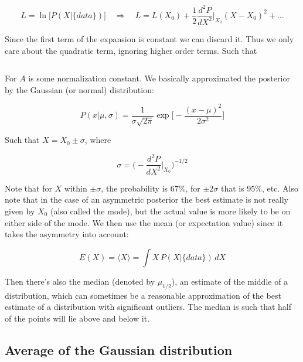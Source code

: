 \documentclass[a4paper]{article}
\begin{document}
\begin{equation}
	L=\ln\big[P(X|\{data\})\big]\quad\Rightarrow\quad L=L(X_0)+\frac{1}{2}\frac{d^2P}{dX^2}\bigg|_{X_0}(X-X_0)^2+\dots
\end{equation}

Since the first term of the expansion is constant we can discard it. Thus we only care about the quadratic term, ignoring higher order terms. Such that

\begin{equation}
	[P(X|\{data\})\approx A\exp\bigg[\frac{1}{2}\frac{d^2P}{dX^2}\bigg|_{X_0}(X-X_0)^2\bigg]
\end{equation}

For $A$ is some normalization constant. We basically approximated the posterior by the Gaussian (or normal) distribution:

\begin{equation}
	P(x|\mu, \sigma)=\frac{1}{\sigma\sqrt{2\pi}}\exp\bigg[-\frac{(x-\mu)^2}{2\sigma^2}\bigg]
\end{equation}

Such that $X=X_0\pm\sigma$, where

\begin{equation}
	\sigma = \bigg(-\frac{d^2P}{dX^2}\bigg|_{X_0}\bigg)^{-1/2}
\end{equation}

Note that for $X$ within $\pm\sigma$, the probability is $67\%$, for $\pm 2\sigma$ that is $95\%$, etc. Also note that in the case of an asymmetric posterior the best estimate is not really given by $X_0$ (also called the mode), but the actual value is more likely to be on either side of the mode. We then use the mean (or expectation value) since it takes the asymmetry into account:

\begin{equation}
	E(X)=\langle X\rangle = \int X\,P(X|\{data\})\,dX
\end{equation}  

Then there's also the median (denoted by $\mu_{1/2}$), an estimate of the middle of a distribution, which can sometimes be a reasonable approximation of the best estimate of a distribution with significant outliers. The median is such that half of the points will lie above and below it.

\subsection{Average of the Gaussian distribution}
\end{document}
